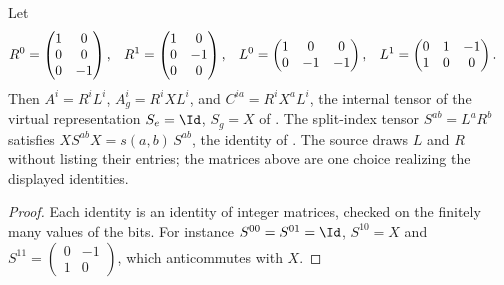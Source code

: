 \begin{lemma}
    \label{thm:mpug_controlled_z_split_index}
    \leanok
    Let
    \begin{align}
        R^0 & =\begin{pmatrix}1&0\\0&0\\0&-1\end{pmatrix}, &
        R^1 & =\begin{pmatrix}1&0\\0&-1\\0&0\end{pmatrix}, &
        L^0 & =\begin{pmatrix}1&0&0\\0&-1&-1\end{pmatrix}, &
        L^1 & =\begin{pmatrix}0&1&-1\\1&0&0\end{pmatrix}.
        \notag
    \end{align}
    Then $A^i=R^iL^i$, $A_g^i=R^iXL^i$, and $C^{ia}=R^iX^aL^i$, the internal
    tensor of the virtual representation $S_e=\Id$, $S_g=X$ of
    \cite[lines~4073--4209]{FrancoRubio2025MPUGauging}. The split-index tensor
    $S^{ab}=L^aR^b$ satisfies $XS^{ab}X=s(a,b)\,S^{ab}$, the identity of
    \cite[lines~4002--4072]{FrancoRubio2025MPUGauging}. The source draws $L$
    and $R$ without listing their entries; the matrices above are one choice
    realizing the displayed identities.
\end{lemma}

\begin{proof}\leanok
    Each identity is an identity of integer matrices, checked on the finitely
    many values of the bits. For instance $S^{00}=S^{01}=\Id$, $S^{10}=X$ and
    $S^{11}=\left(\begin{smallmatrix}0&-1\\1&0\end{smallmatrix}\right)$, which
    anticommutes with $X$.
\end{proof}

